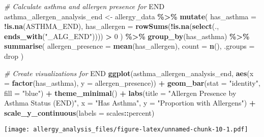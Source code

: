 \documentclass[
]{article}
\newenvironment{Shaded}{\begin{snugshade}}{\end{snugshade}}
\newcommand{\AttributeTok}[1]{\textcolor[rgb]{0.13,0.29,0.53}{#1}}
\newcommand{\CommentTok}[1]{\textcolor[rgb]{0.56,0.35,0.01}{\textit{#1}}}
\newcommand{\DecValTok}[1]{\textcolor[rgb]{0.00,0.00,0.81}{#1}}
\newcommand{\FunctionTok}[1]{\textcolor[rgb]{0.13,0.29,0.53}{\textbf{#1}}}
\newcommand{\NormalTok}[1]{#1}
\newcommand{\OtherTok}[1]{\textcolor[rgb]{0.56,0.35,0.01}{#1}}
\newcommand{\RegionMarkerTok}[1]{#1}
\newcommand{\SpecialCharTok}[1]{\textcolor[rgb]{0.81,0.36,0.00}{\textbf{#1}}}
\newcommand{\StringTok}[1]{\textcolor[rgb]{0.31,0.60,0.02}{#1}}
\begin{document}
\begin{Shaded}
\begin{Highlighting}[]
\CommentTok{\# Calculate asthma and allergen presence for }\RegionMarkerTok{END}
\NormalTok{asthma\_allergen\_analysis\_end }\OtherTok{\textless{}{-}}\NormalTok{ allergy\_data }\SpecialCharTok{\%\textgreater{}\%}
  \FunctionTok{mutate}\NormalTok{(}
    \AttributeTok{has\_asthma =} \SpecialCharTok{!}\FunctionTok{is.na}\NormalTok{(ASTHMA\_END),}
    \AttributeTok{has\_allergen =} \FunctionTok{rowSums}\NormalTok{(}\SpecialCharTok{!}\FunctionTok{is.na}\NormalTok{(}\FunctionTok{select}\NormalTok{(., }\FunctionTok{ends\_with}\NormalTok{(}\StringTok{"\_ALG\_END"}\NormalTok{)))) }\SpecialCharTok{\textgreater{}} \DecValTok{0}
\NormalTok{  ) }\SpecialCharTok{\%\textgreater{}\%}
  \FunctionTok{group\_by}\NormalTok{(has\_asthma) }\SpecialCharTok{\%\textgreater{}\%}
  \FunctionTok{summarise}\NormalTok{(}
    \AttributeTok{allergen\_presence =} \FunctionTok{mean}\NormalTok{(has\_allergen),}
    \AttributeTok{count =} \FunctionTok{n}\NormalTok{(),}
    \AttributeTok{.groups =} \StringTok{\textquotesingle{}drop\textquotesingle{}}
\NormalTok{  )}

\CommentTok{\# Create visualizations for }\RegionMarkerTok{END}
\FunctionTok{ggplot}\NormalTok{(asthma\_allergen\_analysis\_end, }
       \FunctionTok{aes}\NormalTok{(}\AttributeTok{x =} \FunctionTok{factor}\NormalTok{(has\_asthma), }\AttributeTok{y =}\NormalTok{ allergen\_presence)) }\SpecialCharTok{+}
  \FunctionTok{geom\_bar}\NormalTok{(}\AttributeTok{stat =} \StringTok{"identity"}\NormalTok{, }\AttributeTok{fill =} \StringTok{"blue"}\NormalTok{) }\SpecialCharTok{+}
  \FunctionTok{theme\_minimal}\NormalTok{() }\SpecialCharTok{+}
  \FunctionTok{labs}\NormalTok{(}\AttributeTok{title =} \StringTok{"Allergen Presence by Asthma Status (END)"}\NormalTok{,}
       \AttributeTok{x =} \StringTok{"Has Asthma"}\NormalTok{,}
       \AttributeTok{y =} \StringTok{"Proportion with Allergens"}\NormalTok{) }\SpecialCharTok{+}
  \FunctionTok{scale\_y\_continuous}\NormalTok{(}\AttributeTok{labels =}\NormalTok{ scales}\SpecialCharTok{::}\NormalTok{percent)}
\end{Highlighting}
\end{Shaded}

\texttt{[image: allergy\_analysis\_files/figure-latex/unnamed-chunk-10-1.pdf]}
\end{document}
